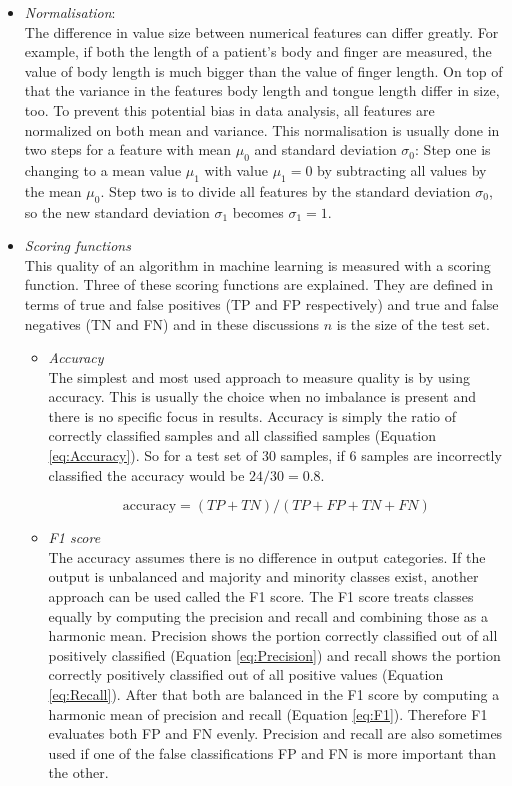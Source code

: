 \documentclass[10pt,a4paper]{report}
\begin{document}
\begin{itemize}
		
		\item \textit{Normalisation}:\\
		The difference in value size between numerical features can differ greatly. For example, if both the length of a patient's body and finger are measured, the value of body length is much bigger than the value of finger length. On top of that the variance in the features body length and tongue length differ in size, too. To prevent this potential bias in data analysis, all features are normalized on both mean and variance. This normalisation is usually done in two steps for a feature with mean $\mu_0$ and standard deviation $\sigma_0$: Step one is changing to a mean value $\mu_1$ with value $\mu_1 = 0$ by subtracting all values by the mean $\mu_0$. Step two is to divide all features by the standard deviation $\sigma_0$, so the new standard deviation $\sigma_1$ becomes $\sigma_1 = 1$.
		\item \textit{Scoring functions} \\
		This quality of an algorithm in machine learning is measured with a scoring function. Three of these scoring functions are explained. They are defined in terms of true and false positives (TP and FP respectively) and true and false negatives (TN and FN) and in these discussions $n$ is the size of the test set.
		\begin{itemize}
			\item \textit{Accuracy} \\
			The simplest and most used approach to measure quality is by using accuracy. This is usually the choice when no imbalance is present and there is no specific focus in results. Accuracy is simply the ratio of correctly classified samples and all classified samples (Equation \ref{eq:Accuracy}). So for a test set of 30 samples, if 6 samples are incorrectly classified the accuracy would be $24/30 = 0.8$. 
			
			\begin{equation}\label{eq:Accuracy}
			\text{accuracy} = (TP + TN) / (TP + FP + TN + FN)
			\end{equation}
			
			\item \textit{F1 score} \\
			The accuracy assumes there is no difference in output categories. If the output is unbalanced and majority and minority classes exist, another approach can be used called the F1 score. The F1 score treats classes equally by computing the precision and recall and combining those as a harmonic mean. Precision shows the portion correctly classified out of all positively classified (Equation \ref{eq:Precision}) and recall shows the portion correctly positively classified out of all positive values (Equation \ref{eq:Recall}). After that both are balanced in the F1 score by computing a harmonic mean of precision and recall (Equation \ref{eq:F1}). Therefore F1 evaluates both FP and FN evenly. Precision and recall are also sometimes used if one of the false classifications FP and FN is more important than the other.
			

\end{itemize}
\end{itemize}
\end{document}
